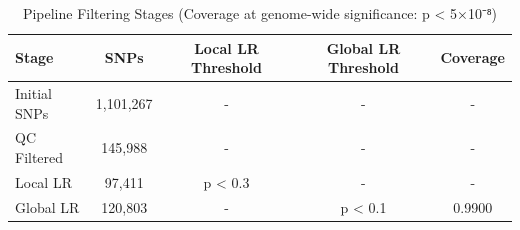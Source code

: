 \begin{table}[htbp]
\centering
\caption{Pipeline Filtering Stages (Coverage at genome-wide significance: p < 5×10⁻⁸)}
\label{tab:filtering}
\begin{tabular}{lcccc}
\toprule
Stage & SNPs & Local LR Threshold & Global LR Threshold & Coverage \\
\midrule
Initial SNPs & 1,101,267 & - & - & - \\
QC Filtered & 145,988 & - & - & - \\
Local LR & 97,411 & p < 0.3 & - & - \\
Global LR & 120,803 & - & p < 0.1 & 0.9900 \\
\bottomrule
\end{tabular}
\end{table}